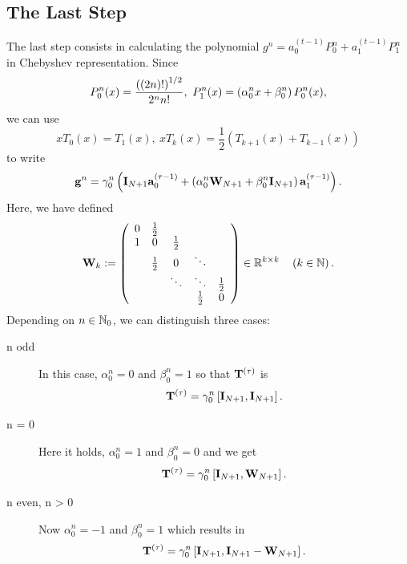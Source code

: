 \subsection{The Last Step}
\label{NFSFT:LinearAlgebra:LastStep}
The last step consists in calculating the polynomial $g^{n} = a_{0}^{(t-1)} P_{0}^{n} + a_{1}^{(t-1)} P_{1}^{n}$ in Chebyshev representation. Since 
$$
  P_{0}^n{\hspace{-0.4ex}}\left(x\right) = \frac{\left( \left( 2n \right) ! \right)^{1/2}}{2^n n!},\ P_{1}^n{\hspace{-0.4ex}}\left(x\right) = \left(\alpha_{0}^n x + \beta_{0}^n\right)P_{0}^n(x),
$$ 
we can use 
$$
  xT_{0}(x) = T_{1}(x),\ xT_{k}(x) = \frac{1}{2}\left( T_{k+1}(x) + T_{k-1}(x) \right)
$$ 
to write
$$ 
  \mathbf{g}^{n} = \gamma_{0}^n \left( \mathbf{I}_{N+1} \mathbf{a}_{0}^{(\tau-1)} + \left( \alpha_{0}^n\mathbf{W}_{N+1} + \beta_{0}^n\mathbf{I}_{N+1} \right) \mathbf{a}_{1}^{(\tau-1)} \right).
$$
Here, we have defined
$$
\mathbf{W}_{k} :=
\left(
\begin{array}{ccccccc}
  0 & \frac{1}{2} &             &                           \\
  1 &           0 & \frac{1}{2} &                           \\
    & \frac{1}{2} &           0 & \ddots                    \\
    &             &      \ddots & \ddots      & \frac{1}{2} \\
    &             &             & \frac{1}{2} &           0
\end{array}
\right)
\in \mathbb{R}^{k \times k} \quad \left(k \in \mathbb{N}\right).
$$
Depending on $n \in \mathbb{N}_{0}$, we can distinguish three cases:
\begin{description}
  \item[n odd] In this case, $\alpha_{0}^n = 0$ and $\beta_{0}^n = 1$ so that $\mathbf{T}^{(\tau)}$ is 
    $$
      \mathbf{T}^{(\tau)} = \gamma_{0}^n \left[ \mathbf{I}_{N+1}, \mathbf{I}_{N+1} \right].
    $$
  \item[n = 0] Here it holds, $\alpha_{0}^n = 1$ and $\beta_{0}^n = 0$ and we get $$\mathbf{T}^{(\tau)} = \gamma_{0}^n \left[ \mathbf{I}_{N+1}, \mathbf{W}_{N+1} \right].$$
  \item[n even, n > 0] Now $\alpha_{0}^n = -1$ and $\beta_{0}^n = 1$ which results in $$\mathbf{T}^{(\tau)} = \gamma_{0}^n \left[ \mathbf{I}_{N+1}, \mathbf{I}_{N+1} - \mathbf{W}_{N+1} \right].$$
\end{description}

